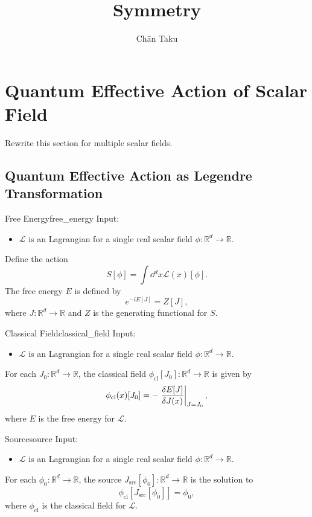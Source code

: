 \documentclass{article}
\title{Symmetry}
\author{Ch\=an Taku}
\begin{document}
\maketitle

\section{Quantum Effective Action of Scalar Field}

\begin{warning}
    Rewrite this section for multiple scalar fields.
\end{warning}

\subsection{Quantum Effective Action as Legendre Transformation}

\begin{definition}{Free Energy}{free_energy}
    Input:
    \begin{itemize}
        \item $\mathcal{L}$ is an Lagrangian for a single real scalar field $\phi: \mathbb{R}^d \rightarrow \mathbb{R}$.
    \end{itemize}
    Define the action
    \[ S[\phi] = \int \dd{^d x} \mathcal{L}(x)[\phi]. \]
    The free energy $E$ is defined by
    \[ e^{-i E[J]} = Z[J], \]
    where $J:\mathbb{R}^d \rightarrow \mathbb{R}$ and $Z$ is the generating functional for $S$.
\end{definition}

\begin{definition}{Classical Field}{classical_field}
    Input:
    \begin{itemize}
        \item $\mathcal{L}$ is an Lagrangian for a single real scalar field $\phi: \mathbb{R}^d \rightarrow \mathbb{R}$.
    \end{itemize}
    For each $J_0: \mathbb{R}^d \rightarrow \mathbb{R}$, the classical field $\phi_{\mathrm{cl}}[J_0]: \mathbb{R}^d \rightarrow \mathbb{R}$ is given by
    \[ \phi_{\mathrm{cl}}(x)[J_0] = -\eval{\frac{\delta E[J]}{\delta J(x)}}_{J=J_0}, \]
    where $E$ is the free energy for $\mathcal{L}$.
\end{definition}

\begin{definition}{Source}{source}
    Input:
    \begin{itemize}
        \item $\mathcal{L}$ is an Lagrangian for a single real scalar field $\phi: \mathbb{R}^d \rightarrow \mathbb{R}$.
    \end{itemize}
    For each $\phi_0: \mathbb{R}^d \rightarrow \mathbb{R}$, the source $J_{\mathrm{src}}[\phi_0]: \mathbb{R}^d \rightarrow \mathbb{R}$ is the solution to
    \[ \phi_{\mathrm{cl}}[J_{\mathrm{src}}[\phi_0]] = \phi_0, \]
    where $\phi_{\mathrm{cl}}$ is the classical field for $\mathcal{L}$.
\end{definition}
\end{document}
